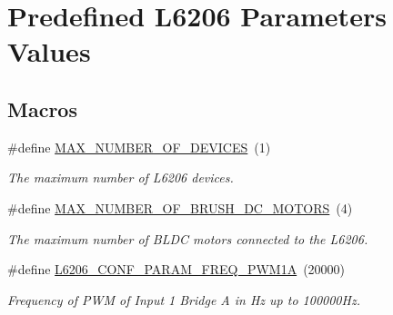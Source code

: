 \hypertarget{group___predefined___l6206___parameters___values}{}\section{Predefined L6206 Parameters Values}
\label{group___predefined___l6206___parameters___values}
\subsection*{Macros}
\begin{DoxyCompactItemize}
\item 
\mbox{\label{group___predefined___l6206___parameters___values_ga7030f06080f33abc12eacc4710be6150}} 
\#define \mbox{\hyperlink{group___predefined___l6206___parameters___values_ga7030f06080f33abc12eacc4710be6150}{M\+A\+X\+\_\+\+N\+U\+M\+B\+E\+R\+\_\+\+O\+F\+\_\+\+D\+E\+V\+I\+C\+ES}}~(1)
\begin{DoxyCompactList}\small\item\em The maximum number of L6206 devices. \end{DoxyCompactList}\item 
\mbox{\label{group___predefined___l6206___parameters___values_ga0b90dd5082ee30880d10c53227004768}} 
\#define \mbox{\hyperlink{group___predefined___l6206___parameters___values_ga0b90dd5082ee30880d10c53227004768}{M\+A\+X\+\_\+\+N\+U\+M\+B\+E\+R\+\_\+\+O\+F\+\_\+\+B\+R\+U\+S\+H\+\_\+\+D\+C\+\_\+\+M\+O\+T\+O\+RS}}~(4)
\begin{DoxyCompactList}\small\item\em The maximum number of B\+L\+DC motors connected to the L6206. \end{DoxyCompactList}\item 
\mbox{\label{group___predefined___l6206___parameters___values_gabd75600fa317e4756a96feb459e49545}} 
\#define \mbox{\hyperlink{group___predefined___l6206___parameters___values_gabd75600fa317e4756a96feb459e49545}{L6206\+\_\+\+C\+O\+N\+F\+\_\+\+P\+A\+R\+A\+M\+\_\+\+F\+R\+E\+Q\+\_\+\+P\+W\+M1A}}~(20000)
\begin{DoxyCompactList}\small\item\em Frequency of P\+WM of Input 1 Bridge A in Hz up to 100000\+Hz. \end{DoxyCompactList}\item 

\end{DoxyCompactItemize}
